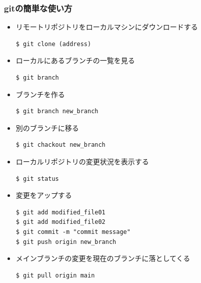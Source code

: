 \subsubsection{gitの簡単な使い方}
\begin{itemize}
    \item リモートリポジトリをローカルマシンにダウンロードする
    \begin{lstlisting}
$ git clone (address)
    \end{lstlisting}
    \item ローカルにあるブランチの一覧を見る
    \begin{lstlisting}
$ git branch
    \end{lstlisting}
    \item ブランチを作る
    \begin{lstlisting}
$ git branch new_branch
    \end{lstlisting}
    \item 別のブランチに移る
    \begin{lstlisting}
$ git chackout new_branch
    \end{lstlisting}
    \item ローカルリポジトリの変更状況を表示する
    \begin{lstlisting}
$ git status
    \end{lstlisting}
    \item 変更をアップする
    \begin{lstlisting}
$ git add modified_file01
$ git add modified_file02
$ git commit -m "commit message"
$ git push origin new_branch
    \end{lstlisting}
    \item メインブランチの変更を現在のブランチに落としてくる
    \begin{lstlisting}
$ git pull origin main
    \end{lstlisting}
\end{itemize}